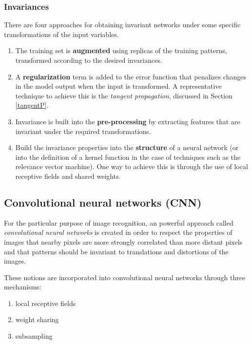 \documentclass[a4paper]{book}
\newcommand{\imp}[1]{\textit{#1}}
\begin{document}
\subsubsection{Invariances}
There are four approaches for obtaining invariant networks under some specific transformations of the input variables.
\begin{enumerate}
	\item The training set is \textbf{augmented} using replicas of the training patterns, transformed according to the desired invariances.
	\item A \textbf{regularization} term is added to the error function that penalizes changes in the model output when the input is transformed. A representative technique to achieve this is the \imp{tangent propagation}, discussed in Section \ref{tangentP}.
	\item Invariance is built into the \textbf{pre-processing} by extracting features that are invariant under the required transformations.
	\item Build the invariance properties into the \textbf{structure} of a neural network (or into the definition of a kernel function in the case of techniques such as the relevance vector machine). One way to achieve this is through the use of local receptive fields and shared weights.
\end{enumerate}
\subsection{Convolutional neural networks (CNN)}
For the particular purpose of image recognition, an powerful approach called \imp{convolutional neural networks} is created in order to respect the properties of images that nearby pixels are more strongly correlated than more distant pixels and that patterns should be invariant to translations and distortions of the images.

These notions are incorporated into convolutional neural networks through three mechanisms: 
\begin{enumerate}
	\item local receptive fields
	\item weight sharing
	\item subsampling
\end{enumerate}
\end{document}
